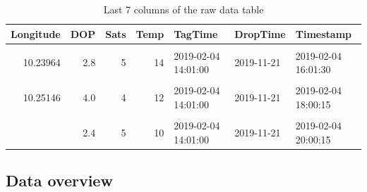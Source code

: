 \documentclass[
]{article}
\begin{document}
\begin{table}[H]

\caption{\label{tab:unnamed-chunk-1}Last 7 columns of the raw data table}
\centering
\begin{tabular}[t]{rrrrlll}
\toprule
\textbf{Longitude} & \textbf{DOP} & \textbf{Sats} & \textbf{Temp} & \textbf{TagTime} & \textbf{DropTime} & \textbf{Timestamp}\\
\midrule
\cellcolor{gray!6}{10.22879} & \cellcolor{gray!6}{5.4} & \cellcolor{gray!6}{4} & \cellcolor{gray!6}{16} & \cellcolor{gray!6}{2019-02-04 14:01:00} & \cellcolor{gray!6}{2019-11-21} & \cellcolor{gray!6}{2019-02-04 15:01:57}\\
10.23964 & 2.8 & 5 & 14 & 2019-02-04 14:01:00 & 2019-11-21 & 2019-02-04 16:01:30\\
\cellcolor{gray!6}{10.24342} & \cellcolor{gray!6}{2.4} & \cellcolor{gray!6}{5} & \cellcolor{gray!6}{10} & \cellcolor{gray!6}{2019-02-04 14:01:00} & \cellcolor{gray!6}{2019-11-21} & \cellcolor{gray!6}{2019-02-04 17:00:45}\\
10.25146 & 4.0 & 4 & 12 & 2019-02-04 14:01:00 & 2019-11-21 & 2019-02-04 18:00:15\\
\cellcolor{gray!6}{10.25866} & \cellcolor{gray!6}{3.0} & \cellcolor{gray!6}{6} & \cellcolor{gray!6}{10} & \cellcolor{gray!6}{2019-02-04 14:01:00} & \cellcolor{gray!6}{2019-11-21} & \cellcolor{gray!6}{2019-02-04 19:00:45}\\
\addlinespace
10.25861 & 2.4 & 5 & 10 & 2019-02-04 14:01:00 & 2019-11-21 & 2019-02-04 20:00:15\\
\bottomrule
\end{tabular}
\end{table}

\hypertarget{data-overview}{%
\subsection{Data overview}\label{data-overview}}
\end{document}
